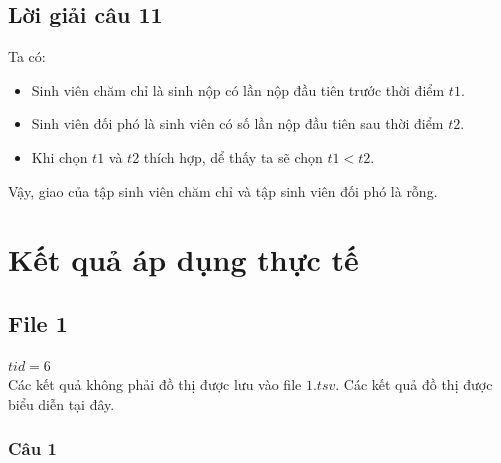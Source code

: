 \documentclass[a4paper]{article}
\theoremstyle{definition}
\begin{document}
\subsection{Lời giải câu 11}
Ta có:
\begin{itemize}
    \item Sinh viên chăm chỉ là sinh nộp có lần nộp đầu tiên trước thời điểm $t1$.
    \item Sinh viên đối phó là sinh viên có số lần nộp đầu tiên sau thời điểm $t2$.
    \item Khi chọn $t1$ và $t2$ thích hợp, dể thấy ta sẽ chọn $t1 < t2$.
\end{itemize}
Vậy, giao của tập sinh viên chăm chỉ và tập sinh viên đối phó là rỗng. 
\newpage
 
\section{Kết quả áp dụng thực tế}
\subsection{File 1}
\textbf{$tid = 6$}\\
Các kết quả không phải đồ thị được lưu vào file $1.tsv$. Các kết quả đồ thị được biểu diễn tại đây.
\subsubsection{Câu 1}
\end{document}
